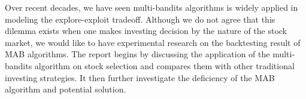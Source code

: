 \documentclass{article}
\title{     }
\author{     }
\date{     }
\begin{document}
Over recent decades, we have seen multi-bandits algorithms is widely applied in modeling the explore-exploit tradeoff. Although we do not agree that this dilemma exists when one makes investing decision by the nature of the stock market, we would like to have experimental research on the backtesting result of MAB algorithms. The report begins by discussing the application of the multi-bandits algorithm on stock selection and compares them with other traditional investing strategies. It then further investigate the deficiency of the MAB algorithm and potential solution.
\end{document}
